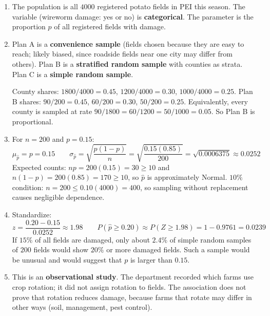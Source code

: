 \documentclass[11pt]{article}
\begin{document}
\begin{solution}
\begin{enumerate}
  \item The population is all $4000$ registered potato fields in PEI this season. The variable (wireworm damage: yes or no) is \textbf{categorical}. The parameter is the proportion $p$ of all registered fields with damage.
  \item Plan A is a \textbf{convenience sample} (fields chosen because they are easy to reach; likely biased, since roadside fields near one city may differ from others). Plan B is a \textbf{stratified random sample} with counties as strata. Plan C is a \textbf{simple random sample}.

  County shares: $1800/4000=0.45$, $1200/4000=0.30$, $1000/4000=0.25$. Plan B shares: $90/200=0.45$, $60/200=0.30$, $50/200=0.25$. Equivalently, every county is sampled at rate $90/1800=60/1200=50/1000=0.05$. So Plan B is proportional.
  \item For $n=200$ and $p=0.15$:
  \[
  \mu_{\hat p}=p=0.15
  \qquad
  \sigma_{\hat p}=\sqrt{\frac{p(1-p)}{n}}=\sqrt{\frac{0.15(0.85)}{200}}=\sqrt{0.0006375}\approx0.0252
  \]
  Expected counts: $np=200(0.15)=30\geq10$ and $n(1-p)=200(0.85)=170\geq10$, so $\hat p$ is approximately Normal.
  $10\%$ condition: $n=200\leq0.10(4000)=400$, so sampling without replacement causes negligible dependence.
  \item Standardize:
  \[
  z=\frac{0.20-0.15}{0.0252}\approx1.98
  \qquad
  P(\hat p\geq0.20)\approx P(Z\geq1.98)=1-0.9761=0.0239
  \]
  If $15\%$ of all fields are damaged, only about $2.4\%$ of simple random samples of $200$ fields would show $20\%$ or more damaged fields. Such a sample would be unusual and would suggest that $p$ is larger than $0.15$.

  \begin{center}
  \end{center}
  \item This is an \textbf{observational study}. The department recorded which farms use crop rotation; it did not assign rotation to fields. The association does not prove that rotation reduces damage, because farms that rotate may differ in other ways (soil, management, pest control).
\end{enumerate}
\end{solution}
\end{document}
